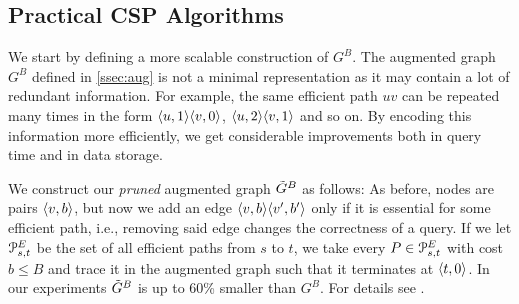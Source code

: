 \subsection{Practical CSP Algorithms} 
\label{ssec:practical}

We start by defining a more scalable construction of $G^B$.
The augmented graph $G^B$ defined in \cref{ssec:aug} is not a minimal representation as it may contain a lot of redundant information.
For example, the same efficient path $uv$ can be repeated many times in the form $\langle u,1\rangle\langle v,0\rangle$, $\langle u,2\rangle\langle v,1\rangle$ and so on.
By encoding this information more efficiently, we get considerable improvements both in query time and in data storage.

We construct our \emph{pruned} augmented graph $\tilde G^B$ as follows:
As before, nodes are pairs $\langle v,b\rangle$, but now we add an edge $\langle v,b\rangle\langle v',b'\rangle$ only if it is essential for some efficient path, i.e., removing said edge changes the correctness of a query.
If we let $\mathcal{P}_{s,t}^E$ be the set of all efficient paths from $s$ to $t$, we take every $P\in \mathcal{P}_{s,t}^E$ with cost $b\leq B$ and trace it in the augmented graph such that it terminates at $\langle t,0\rangle$.
%
In our experiments $\tilde G^B$ is up to 60\% smaller than $G^B$.
For details see \cite{TechReport}.

%

